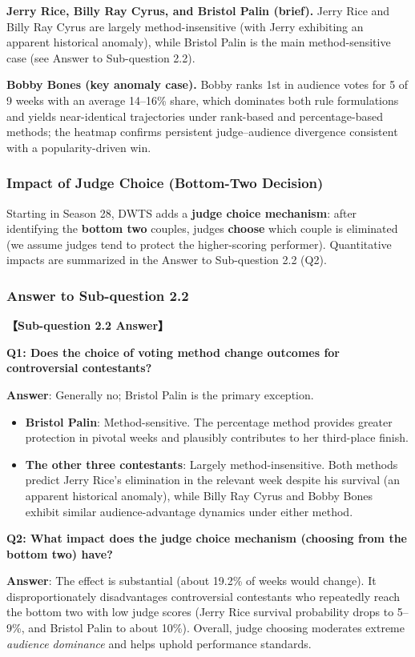 \textbf{Jerry Rice, Billy Ray Cyrus, and Bristol Palin (brief).} Jerry Rice and Billy Ray Cyrus are largely method-insensitive (with Jerry exhibiting an apparent historical anomaly), while Bristol Palin is the main method-sensitive case (see Answer to Sub-question 2.2).

\textbf{Bobby Bones (key anomaly case).} Bobby ranks 1st in audience votes for 5 of 9 weeks with an average 14--16\% share, which dominates both rule formulations and yields near-identical trajectories under rank-based and percentage-based methods; the heatmap confirms persistent judge--audience divergence consistent with a popularity-driven win.

\subsubsection{Impact of Judge Choice (Bottom-Two Decision)}

Starting in Season 28, DWTS adds a \textbf{judge choice mechanism}: after identifying the \textbf{bottom two} couples, judges \textbf{choose} which couple is eliminated (we assume judges tend to protect the higher-scoring performer). Quantitative impacts are summarized in the Answer to Sub-question 2.2 (Q2).

\subsubsection{Answer to Sub-question 2.2}

\begin{answerbox}
\noindent\textbf{【Sub-question 2.2 Answer】}

\textbf{Q1: Does the choice of voting method change outcomes for controversial contestants?}

\textbf{Answer}: Generally no; Bristol Palin is the primary exception.
\begin{itemize}
    \item \textbf{Bristol Palin}: Method-sensitive. The percentage method provides greater protection in pivotal weeks and plausibly contributes to her third-place finish.
    \item \textbf{The other three contestants}: Largely method-insensitive. Both methods predict Jerry Rice's elimination in the relevant week despite his survival (an apparent historical anomaly), while Billy Ray Cyrus and Bobby Bones exhibit similar audience-advantage dynamics under either method.
\end{itemize}

\textbf{Q2: What impact does the judge choice mechanism (choosing from the bottom two) have?}

\textbf{Answer}: The effect is substantial (about 19.2\% of weeks would change). It disproportionately disadvantages controversial contestants who repeatedly reach the bottom two with low judge scores (Jerry Rice survival probability drops to 5--9\%, and Bristol Palin to about 10\%). Overall, judge choosing moderates extreme \textit{audience dominance} and helps uphold performance standards.
\end{answerbox}

